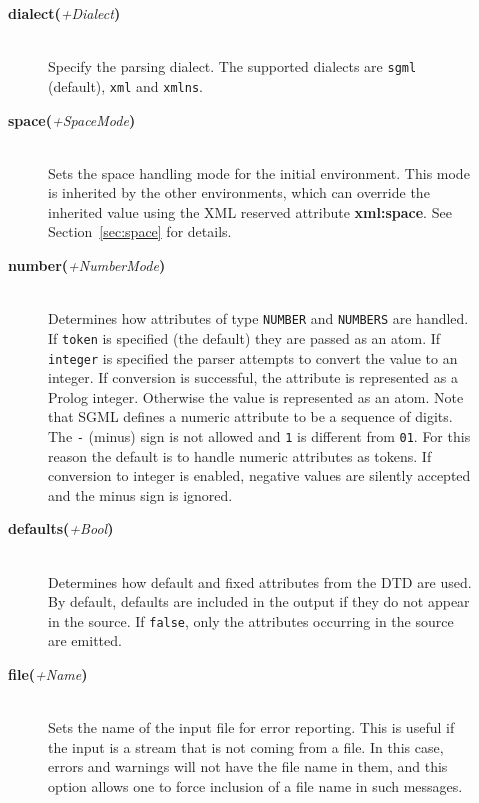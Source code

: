 \begin{description}
\begin{description}
  \item[{\bf dialect}{\bf (}{\it +Dialect}{\bf )}]\mbox{}\\
    Specify the parsing dialect. The supported dialects are
    {\tt sgml} (default),
    {\tt xml} 
    and {\tt xmlns}.
    
  \item[{\bf space}{\bf (}{\it +SpaceMode}{\bf )}]\mbox{}\\
    Sets the space handling mode for the initial environment. This mode is
    inherited by the other environments, which can override the inherited
    value using the XML reserved attribute {\bf xml:space}. See
    Section~\ref{sec:space} for details.

  \item[{\bf number}{\bf (}{\it +NumberMode}{\bf )}]\mbox{}\\
    Determines how attributes of type {\tt NUMBER} and {\tt NUMBERS} are
    handled.  If {\tt token} is specified (the default) they are passed as
    an atom.  If {\tt integer} is specified the parser attempts to convert
    the value to an integer.  If conversion is successful, the attribute is
    represented as a Prolog integer.  Otherwise the value is represented as
    an atom.  Note that SGML defines a numeric attribute to be a sequence
    of digits.  The {\tt -} (minus) sign is not allowed and {\tt 1} is
    different from {\tt 01}.  For this reason the default is to handle
    numeric attributes as tokens.  If conversion to integer is enabled,
    negative values are silently accepted and the minus sign is ignored.


  \item[{\bf defaults}{\bf (}{\it +Bool}{\bf )}]\mbox{}\\
    Determines how default and fixed attributes from the DTD are used.  By
    default, defaults are included in the output if they do not appear in
    the source.  If {\tt false}, only the attributes occurring in the source
    are emitted.
    
    
  \item[{\bf file}{\bf (}{\it +Name}{\bf )}]\mbox{}\\
    Sets the name of the input file for error reporting.
    This is useful if the input is a stream that is not coming from 
    a file. In this case, errors and warnings will not have the file name
    in them, and this option allows one to force inclusion of a file name
    in such messages.


\end{description}
\end{description}
